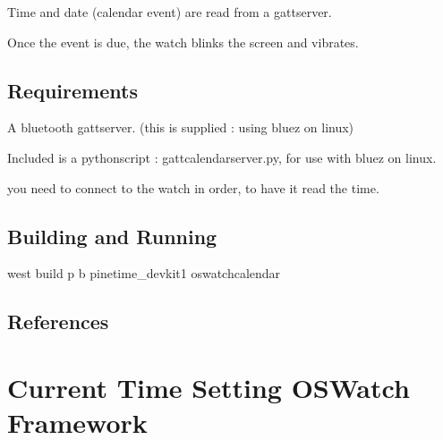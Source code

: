 \documentclass[letterpaper,10pt,english]{sphinxmanual}
\begin{document}
Time and date (calendar event) are read from a gatt\sphinxhyphen{}server.

Once the event is due, the watch blinks the screen and vibrates.


\subsection{Requirements}
\label{\detokenize{samples/oswatch-calendarREADME:requirements}}
A bluetooth gatt\sphinxhyphen{}server. (this is supplied : using bluez on linux)

Included is a python\sphinxhyphen{}script : gatt\sphinxhyphen{}calendar\sphinxhyphen{}server.py, for use with bluez on linux.

\begin{sphinxVerbatim}[commandchars=\\\{\}]
 
\end{sphinxVerbatim}

you need to connect to the watch in order, to have it read the time.

\begin{sphinxVerbatim}[commandchars=\\\{\}]
      
      
\end{sphinxVerbatim}


\subsection{Building and Running}
\label{\detokenize{samples/oswatch-calendarREADME:building-and-running}}
west build \sphinxhyphen{}p \sphinxhyphen{}b  pinetime\_devkit1 oswatch\sphinxhyphen{}calendar


\subsection{References}
\label{\detokenize{samples/oswatch-calendarREADME:references}}

\section{Current Time Setting  OSWatch Framework}
\label{\detokenize{samples/oswatch-ctsREADME:current-time-setting-oswatch-framework}}\label{\detokenize{samples/oswatch-ctsREADME:oswatch}}\label{\detokenize{samples/oswatch-ctsREADME::doc}}
\end{document}
